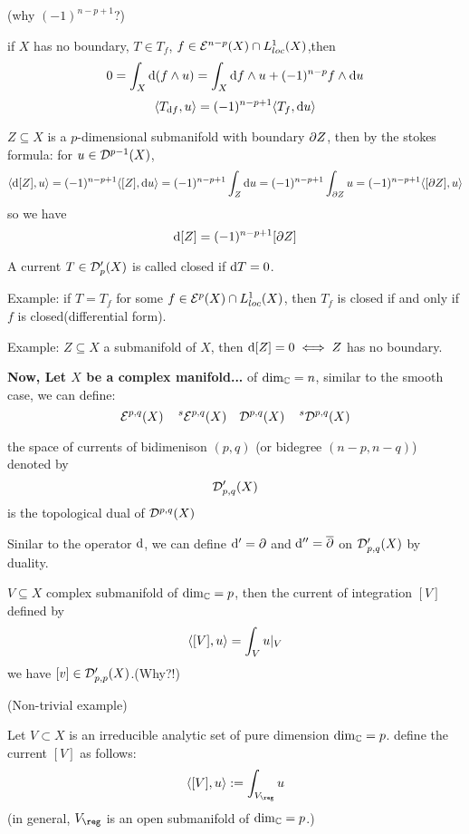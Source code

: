 (why $(-1)^{n-p+1}$?)

\begin{rem}
if $X$ has no boundary,
$T\in T_f$, $f\in\mathcal{E}^{n-p}(X)\cap L^1_{loc}(X)$,then
$$
  0=\int_X\mathrm{d}(f\wedge u)
=\int_X\mathrm{d} f\wedge u+(-1)^{n-p}f\wedge\mathrm{d} u
$$
$$
  \langle T_{\mathrm{d} f},u \rangle
=(-1)^{n-p+1}\langle T_f,\mathrm{d} u \rangle
$$
\end{rem}

\begin{example}
$Z\subseteq X$ is a $p$-dimensional submanifold with
boundary $\partial Z$, then by the stokes formula:
for $u\in\mathcal{D}^{p-1}(X)$,
$$
  \langle \mathrm{d}[Z],u \rangle
=
  (-1)^{n-p+1}
  \langle [Z],\mathrm{d} u \rangle
=
  (-1)^{n-p+1}\int_Z\mathrm{d} u
= (-1)^{n-p+1}\int_{\partial Z}u
= (-1)^{n-p+1}\langle [\partial Z],u \rangle
$$
so we have
$$\mathrm{d}[Z]=(-1)^{n-p+1}[\partial Z]$$
\end{example}

\begin{definition}
A current $T\in\mathcal{D}'_p(X)$ is called closed
if $\mathrm{d} T=0$.
\end{definition}

Example: if $T=T_f$ for some $f\in\mathcal{E}^p(X)\cap L^1_{loc}(X)$,
then $T_f$ is closed if and only if $f$ is closed(differential form).

Example: $Z\subseteq X$ a submanifold of $X$, then
$\mathrm{d}[Z]=0\iff Z$ has no boundary.

\textbf{Now, Let $X$ be a complex manifold...}
of $\dim_{\mathbb{C}}=n$, similar to the smooth case,
we can define:
$$
  \mathcal{E}^{p,q}(X)\quad
  \,^s\mathcal{E}^{p,q}(X)\quad
  \mathcal{D}^{p,q}(X)\quad
  \,^s\mathcal{D}^{p,q}(X)
$$

\begin{definition}
the space of currents of bidimenison $(p,q)$
(or bidegree $(n-p,n-q)$) denoted by
$$
  \mathcal{D}'_{p,q}(X)
$$
is the topological dual of $\mathcal{D}^{p,q}(X)$
\end{definition}

Sinilar to the operator $\mathrm{d}$, we can define
$\mathrm{d}'=\partial$ and $\mathrm{d}''=\overline{\partial}$ on $\mathcal{D}'_{p,q}(X)$
by duality.

\begin{example}
$V\subseteq X$ complex submanifold of $\dim_{\mathbb{C}}=p$,
then the current of integration $[V]$ defined by
$$
  \langle [V],u \rangle
=
  \int_V u|_V
$$
we have $[v]\in\mathcal{D}'_{p,p}(X)$.(Why?!)
\end{example}

\begin{example}(Non-trivial example)

Let $V\subset X$ is an irreducible analytic set of
pure dimension $\dim_{\mathbb{C}}=p$. define the current
$[V]$ as follows:
$$
  \pair{[V]}{u}
:=
  \int_{V_{\reg}}u
$$
(in general, $V_{\reg}$ is an open submanifold of $\dim_{\mathbb{C}}=p$.)
\end{example}

